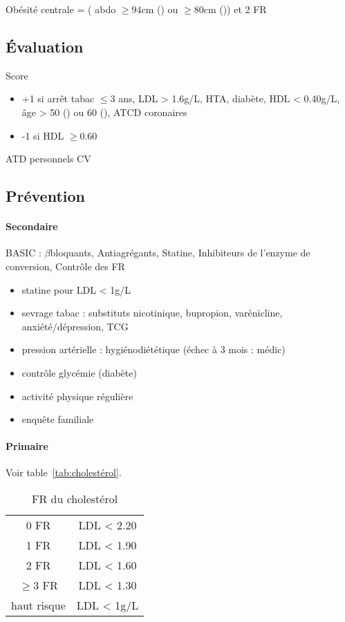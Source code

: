 \documentclass{article}
\begin{document}
Obésité centrale = (\diameter{} abdo $\ge 94 $cm (\male) ou $\ge 80$cm (\female))
et 2 FR


\subsection{Évaluation}
\label{subsec:fr}
Score
\begin{itemize}
  \item +1 si {arrêt tabac $\le 3$ ans, LDL > 1.6g/L, HTA, diabète, HDL < 0.40g/L, âge > 50
(\male) ou 60 (\female), ATCD coronaires}
  \item  -1 si HDL $\ge 0.60$
\end{itemize}

ATD personnels CV

\subsection{Prévention}
\paragraph{Secondaire}
\label{subsec:basic_prev}        
BASIC : $\beta$bloquants, Antiagrégants, Statine, Inhibiteurs de l'enzyme de
conversion, Contrôle des FR

\begin{itemize}
  \item statine pour LDL < 1g/L
\item sevrage tabac : substituts nicotinique, {bupropion, varénicline},
  anxiété/dépression, TCG
  \item pression artérielle : hygiénodiététique (échec à 3 mois : médic)
  \item contrôle glycémie (diabète)
  \item activité physique régulière
  \item enquête familiale
\end{itemize}

\paragraph{Primaire}
Voir table~\ref{tab:cholestérol}.

\begin{table}
  \centering
  \begin{tabular}{cc}
    0 FR & LDL < 2.20 \\
    1 FR & LDL < 1.90\\
    2 FR & LDL < 1.60\\
    $\ge 3$ FR& LDL < 1.30 \\
    haut risque & LDL < 1g/L
  \end{tabular}
  \caption{FR du cholestérol}
  \label{tab:cholesterol}
\end{table}
\end{document}
